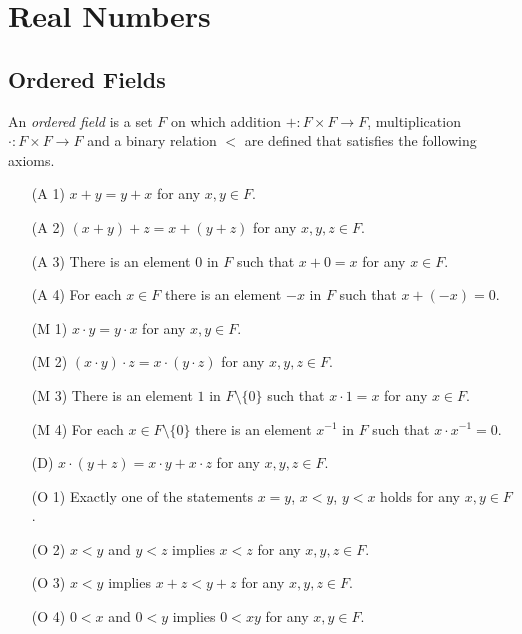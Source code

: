 \chapter{Real Numbers}
\section{Ordered Fields}
\begin{definition}
  An \emph{ordered field} is a set $F$ on which addition $+: F \times F \to F$,
  multiplication $\cdot: F \times F \to F$ and a binary relation $<$ are
  defined that satisfies the following axioms.
  \begin{enumerate}[leftmargin=3.5em]
    \item[(A 1)] $x + y  = y + x$ for any $x, y \in F$.
    \item[(A 2)] $(x + y) + z = x + (y + z)$ for any $x, y, z \in F$.
    \item[(A 3)] There is an element $0$ in $F$ such that $x + 0 = x$ for any
    $x \in F$.
    \item[(A 4)] For each $x \in F$ there is an element $-x$ in $F$ such that
    $x + (-x) = 0$.
    \item[(M 1)] $x \cdot y  = y \cdot x$ for any $x, y \in F$.
    \item[(M 2)] $(x \cdot y) \cdot z = x \cdot (y \cdot z)$ for any
    $x, y, z \in F$.
    \item[(M 3)] There is an element $1$ in $F \setminus \{0\}$ such that
    $x \cdot 1 = x$ for any $x \in F$.
    \item[(M 4)] For each $x \in F \setminus \{0\}$ there is an element
    $x^{-1}$ in $F$ such that $x \cdot x^{-1} = 0$.
    \item[(D)] $x \cdot (y + z) = x \cdot y + x \cdot z$ for any
    $x, y, z \in F$.
    \item[(O 1)] Exactly one of the statements $x = y$, $x < y$, $y < x$ holds
    for any $x, y \in F$.
    \item[(O 2)] $x < y$ and $y < z$ implies $x < z$ for any $x, y, z \in F$.
    \item[(O 3)] $x < y$ implies $x + z < y + z$ for any $x, y, z \in F$.
    \item[(O 4)] $0 < x$ and $0 < y$ implies $0 < xy$ for any $x, y \in F$.
  \end{enumerate}
\end{definition}